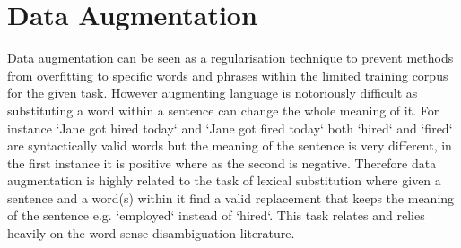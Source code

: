 



\section{Data Augmentation}
Data augmentation can be seen as a regularisation technique to prevent methods from overfitting to specific words and phrases within the limited training corpus for the given task. However augmenting language is notoriously difficult as substituting a word within a sentence can change the whole meaning of it. For instance `Jane got hired today` and `Jane got fired today` both `hired` and `fired` are syntactically valid words but the meaning of the sentence is very different, in the first instance it is positive where as the second is negative. Therefore data augmentation is highly related to the task of lexical substitution \cite{aug_mccarthy-navigli-2007-semeval} where given a sentence and a word(s) within it find a valid replacement that keeps the meaning of the sentence e.g. `employed` instead of `hired`. This task relates and relies heavily on the word sense disambiguation literature.

